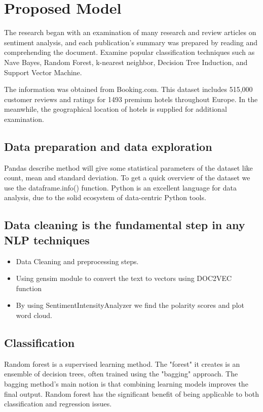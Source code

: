 \section{Proposed Model}
The research began with an examination of many research and review articles on sentiment analysis, and each publication's summary was prepared by reading and comprehending the document. Examine popular classification techniques such as Nave Bayes, Random Forest, k-nearest neighbor, Decision Tree Induction, and Support Vector Machine.

The information was obtained from Booking.com. This dataset includes 515,000 customer reviews and ratings for 1493 premium hotels throughout Europe. In the meanwhile, the geographical location of hotels is supplied for additional examination.


\subsection{Data preparation and data exploration}

Pandas describe method will give some statistical parameters of the dataset like count, mean and standard deviation. To get a quick overview of the dataset we use the dataframe.info() function. Python is an excellent language for data analysis, due to the solid ecosystem of data-centric Python tools.

\subsection{Data cleaning is the fundamental step in any NLP techniques}
\begin{itemize}

\item Data Cleaning and preprocessing steps.
\item Using gensim module to convert the text to vectors using DOC2VEC function 
\item By using SentimentIntensityAnalyzer we find the polarity scores and plot word cloud.
\end{itemize}

\subsection{ Classification}

Random forest is a supervised learning method. The "forest" it creates is an ensemble of decision trees, often trained using the "bagging" approach. The bagging method's main notion is that combining learning models improves the final output. Random forest has the significant benefit of being applicable to both classification and regression issues.

